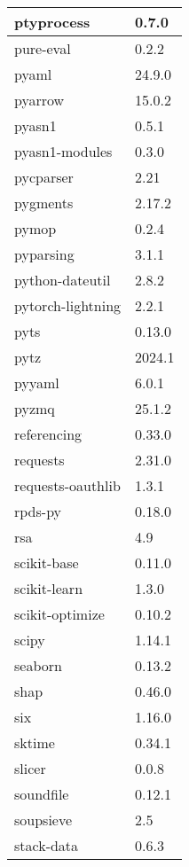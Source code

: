 \begin{longtable}{|l|l|}
	ptyprocess           & 0.7.0 \\ \hline
	pure-eval            & 0.2.2 \\ \hline
	pyaml                & 24.9.0 \\ \hline
	pyarrow              & 15.0.2 \\ \hline
	pyasn1               & 0.5.1 \\ \hline
	pyasn1-modules       & 0.3.0 \\ \hline
	pycparser            & 2.21 \\ \hline
	pygments             & 2.17.2 \\ \hline
	pymop                & 0.2.4 \\ \hline
	pyparsing            & 3.1.1 \\ \hline
	python-dateutil      & 2.8.2 \\ \hline
	pytorch-lightning    & 2.2.1 \\ \hline
	pyts                 & 0.13.0 \\ \hline
	pytz                 & 2024.1 \\ \hline
	pyyaml               & 6.0.1 \\ \hline
	pyzmq                & 25.1.2 \\ \hline
	referencing          & 0.33.0 \\ \hline
	requests             & 2.31.0 \\ \hline
	requests-oauthlib    & 1.3.1 \\ \hline
	rpds-py              & 0.18.0 \\ \hline
	rsa                  & 4.9 \\ \hline
	scikit-base          & 0.11.0 \\ \hline
	scikit-learn         & 1.3.0 \\ \hline
	scikit-optimize      & 0.10.2 \\ \hline
	scipy                & 1.14.1 \\ \hline
	seaborn              & 0.13.2 \\ \hline
	shap                 & 0.46.0 \\ \hline
	six                  & 1.16.0 \\ \hline
	sktime               & 0.34.1 \\ \hline
	slicer               & 0.0.8 \\ \hline
	soundfile            & 0.12.1 \\ \hline
	soupsieve            & 2.5 \\ \hline
	stack-data           & 0.6.3 \\ \hline

\end{longtable}
